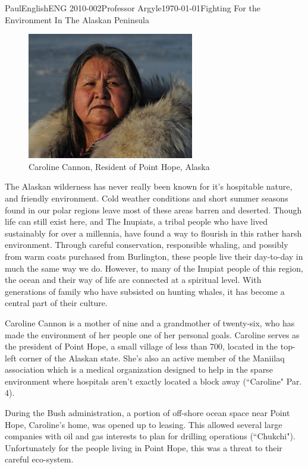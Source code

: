 \documentclass[12pt,letterpaper]{article}
\begin{document}
\begin{mla}{Paul}{English}{ENG 2010-002}{Professor Argyle}{\today}{Fighting For the Environment In The Alaskan Peninsula}

\begin{figure}
  \begin{center}
    \includegraphics[scale=0.5]{2012_nam_cannon.jpeg}
  \end{center}
  \caption{Caroline Cannon, Resident of Point Hope, Alaska}
\end{figure}

The Alaskan wilderness has never really been known for it's hospitable nature, and friendly environment. Cold weather conditions and short summer seasons found in our polar regions leave most of these areas barren and deserted. Though life can still exist here, and The Inupiats, a tribal people who have lived sustainably for over a millennia, have found a way to flourish in this rather harsh environment. Through careful conservation, responsible whaling, and possibly from warm coats purchased from Burlington, these people live their day-to-day in much the same way we do. However, to many of the Inupiat people of this region, the ocean and their way of life are connected at a spiritual level. With generations of family who have subsisted on hunting whales, it has become a central part of their culture.

Caroline Cannon is a mother of nine and a grandmother of twenty-six, who has made the environment of her people one of her personal goals. Caroline serves as the president of Point Hope, a small village of less than 700, located in the top-left corner of the Alaskan state. She's also an active member of the Maniilaq association which is a medical organization designed to help in the sparse environment where hospitals aren't exactly located a block away (``Caroline" Par. 4).

During the Bush administration, a portion of off-shore ocean space near Point Hope, Caroline's home, was opened up to leasing. This allowed several large companies with oil and gas interests to plan for drilling operations (``Chukchi"). Unfortunately for the people living in Point Hope, this was a threat to their careful eco-system.


\end{mla}
\end{document}
